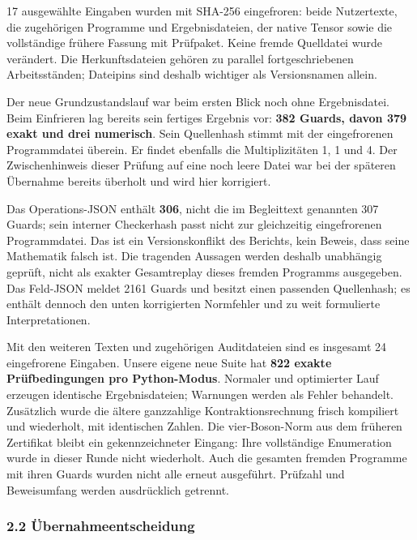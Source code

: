 17 ausgewählte Eingaben wurden mit SHA-256 eingefroren: beide
Nutzertexte, die zugehörigen Programme und Ergebnisdateien, der native
Tensor sowie die vollständige frühere Fassung mit Prüfpaket. Keine
fremde Quelldatei wurde verändert. Die Herkunftsdateien gehören zu
parallel fortgeschriebenen Arbeitsständen; Dateipins sind deshalb
wichtiger als Versionsnamen allein.

Der neue Grundzustandslauf war beim ersten Blick noch ohne
Ergebnisdatei. Beim Einfrieren lag bereits sein fertiges Ergebnis vor:
\textbf{382 Guards, davon 379 exakt und drei numerisch}. Sein
Quellenhash stimmt mit der eingefrorenen Programmdatei überein. Er
findet ebenfalls die Multiplizitäten 1, 1 und 4. Der Zwischenhinweis
dieser Prüfung auf eine noch leere Datei war bei der späteren Übernahme
bereits überholt und wird hier korrigiert.

Das Operations-JSON enthält \textbf{306}, nicht die im Begleittext
genannten 307 Guards; sein interner Checkerhash passt nicht zur
gleichzeitig eingefrorenen Programmdatei. Das ist ein Versionskonflikt
des Berichts, kein Beweis, dass seine Mathematik falsch ist. Die
tragenden Aussagen werden deshalb unabhängig geprüft, nicht als exakter
Gesamtreplay dieses fremden Programms ausgegeben. Das Feld-JSON meldet
2161 Guards und besitzt einen passenden Quellenhash; es enthält dennoch
den unten korrigierten Normfehler und zu weit formulierte
Interpretationen.

Mit den weiteren Texten und zugehörigen Auditdateien sind es insgesamt
24 eingefrorene Eingaben. Unsere eigene neue Suite hat \textbf{822
exakte Prüfbedingungen pro Python-Modus}. Normaler und optimierter Lauf
erzeugen identische Ergebnisdateien; Warnungen werden als Fehler
behandelt. Zusätzlich wurde die ältere ganzzahlige Kontraktionsrechnung
frisch kompiliert und wiederholt, mit identischen Zahlen. Die
vier-Boson-Norm aus dem früheren Zertifikat bleibt ein gekennzeichneter
Eingang: Ihre vollständige Enumeration wurde in dieser Runde nicht
wiederholt. Auch die gesamten fremden Programme mit ihren Guards wurden
nicht alle erneut ausgeführt. Prüfzahl und Beweisumfang werden
ausdrücklich getrennt.

\subsubsection{2.2
Übernahmeentscheidung}\label{uxfcbernahmeentscheidung-1}

